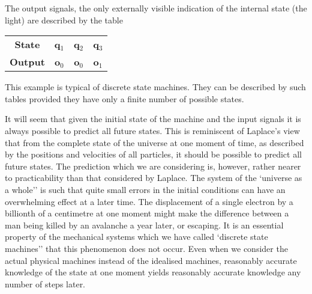 \documentclass[10pt]{article} %
\begin{document}
The output signals, the only externally visible indication of the internal state (the light) are described by the table
\vspace{0.5\baselineskip} %

\begin{center}
    \normalfont %
    \begin{tabular}{cccc}
      \textbf{State} & \textbf{q$_1$} & \textbf{q$_2$} & \textbf{q$_3$} \\
      \textbf{Output} & \textbf{o$_0$} & \textbf{o$_0$} & \textbf{o$_1$} \\
    \end{tabular}
\end{center}
\vspace{0.5\baselineskip} %

This example is typical of discrete state machines. They can be described by such tables provided they have only a finite number of possible states.

It will seem that given the initial state of the machine and the input signals it is always possible to predict all future states. This is reminiscent of Laplace's view that from the complete state of the universe at one moment of time, as described by the positions and velocities of all particles, it should be possible to predict all future states. The prediction which we are considering is, however, rather nearer to practicability than that considered by Laplace. The system of the `universe as a whole'' is such that quite small errors in the initial conditions can have an overwhelming effect at a later time. The displacement of a single electron by a billionth of a centimetre at one moment might make the difference between a man being killed by an avalanche a year later, or escaping. It is an essential property of the mechanical systems which we have called `discrete state machines'' that this phenomenon does not occur. Even when we consider the actual physical machines instead of the idealised machines, reasonably accurate knowledge of the state at one moment yields reasonably accurate knowledge any number of steps later.
\end{document}
